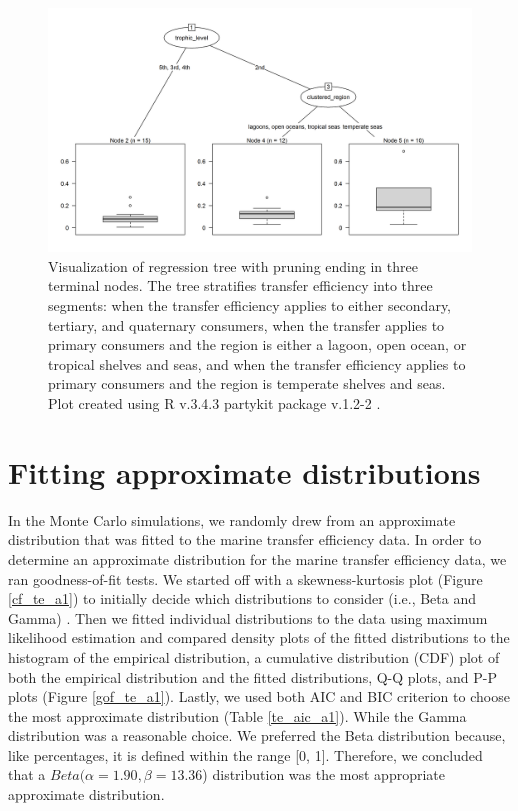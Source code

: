 \documentclass[oneside,12pt,final]{sty/ucthesis-CA2012}
\let\cite\citep                             %
\begin{document}
\begin{mainmatter}
\begin{figure}[H]
     \centering
       \includegraphics[width=\textwidth]{fig/tree}
    \caption{Visualization of regression tree with pruning ending in three terminal nodes. The tree stratifies transfer efficiency into three segments: when the transfer efficiency applies to either secondary, tertiary, and quaternary consumers, when the transfer applies to primary consumers and the region is either a lagoon, open ocean, or tropical shelves and seas, and when the transfer efficiency applies to primary consumers and the region is temperate shelves and seas. Plot created using R v.3.4.3 \cite{Rcite} partykit package v.1.2-2 \cite{hothorn2015partykit}.}
    \label{tree}
\end{figure}

\section{Fitting approximate distributions}
In the Monte Carlo simulations, we randomly drew from an approximate distribution that was fitted to the marine transfer efficiency data. In order to determine an approximate distribution for the marine transfer efficiency data, we ran goodness-of-fit tests. We started off with a skewness-kurtosis plot (Figure \ref{cf_te_a1}) to initially decide which distributions to consider (i.e., Beta and Gamma) \cite{fitdistrplus}. Then we fitted individual distributions to the data using maximum likelihood estimation and compared density plots of the fitted distributions to the histogram of the empirical distribution, a cumulative distribution (CDF) plot of both the empirical distribution and the fitted distributions, Q-Q plots, and P-P plots (Figure \ref{gof_te_a1}). Lastly, we used both AIC and BIC criterion to choose the most approximate distribution (Table \ref{te_aic_a1}). While the Gamma distribution was a reasonable choice. We preferred the Beta distribution because, like percentages, it is defined within the range [0, 1]. Therefore, we concluded that a $Beta(\alpha = 1.90, \beta = 13.36$) distribution was the most appropriate approximate distribution. 


\end{mainmatter}
\end{document}
